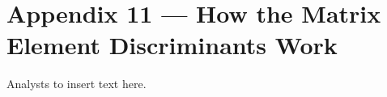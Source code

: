 %
\appendix
\section*{Appendix 11 --- How the Matrix Element Discriminants Work}
\label{appendix-separationmethod-me}

{\color{red}Analysts to insert text here.}
